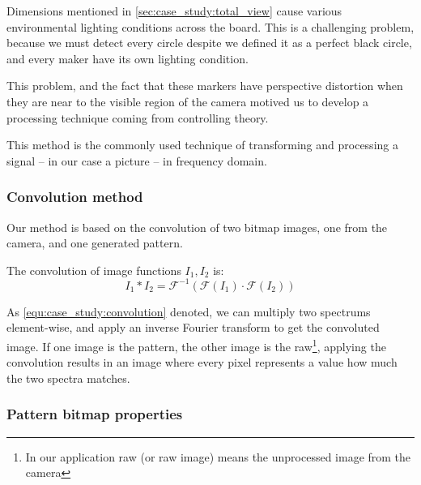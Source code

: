 Dimensions mentioned in \cref{sec:case_study:total_view} cause various environmental lighting conditions across the board. This is a challenging problem, because we must detect every circle despite we defined it as a perfect black circle, and every maker have its own lighting condition. 

This problem, and the fact that these markers have perspective distortion when they are near to the visible region of the camera motived us to develop a processing technique coming from controlling theory.

This method is the commonly used technique of transforming and processing a signal -- in our case a picture -- in frequency domain.

\subsubsection{Convolution method}
\label{sec:case_study:convolution}

Our method is based on the convolution of two bitmap images, one from the camera, and one generated pattern.

\begin{dfn}
	The convolution of image functions $I_1, I_2$ is:
	\begin{equation}
		\label{equ:case_study:convolution}
		I_1 \ast I_2 = \mathscr{F}^{-1}(\mathscr{F}(I_1) \cdot \mathscr{F}(I_2))
	\end{equation}
\end{dfn}

As \cref{equ:case_study:convolution} denoted, we can multiply two spectrums element-wise, and apply an inverse Fourier transform to get the convoluted image. If one image is the pattern, the other image is the raw\footnote{In our application raw (or raw image) means the unprocessed image from the camera}, applying the convolution results in an image where every pixel represents a value how much the two spectra matches.

\subsubsection{Pattern bitmap properties}

